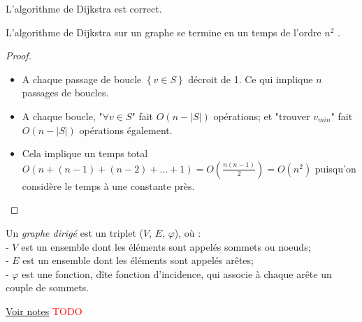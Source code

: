 \begin{mycorr} 
  L’algorithme de Dijkstra est correct.
\end{mycorr}

\begin{mytheo} 
  L’algorithme de Dijkstra sur un graphe se termine en un temps de l’ordre $n^2$ .
  \begin{proof}
    \begin{itemize}
		\item A chaque passage de boucle $\left\lbrace v \in S \right\rbrace $ décroit de 1. Ce qui implique $n$ passages de boucles.
		\item A chaque boucle, "$\forall v \in S$" fait $O(n-|S|)$ opérations; et "trouver $v_{min}$" fait $O(n-|S|)$ opérations également.
		\item Cela implique un temps total $O(n + (n-1) + (n-2) + ... + 1) = O\left( \frac{n(n-1)}{2} \right) = O(n^2)$ puisqu'on considère le temps à une constante près. 
		\end{itemize}
  \end{proof}
\end{mytheo}

\begin{mydef}
  Un \emph{graphe dirigé} est un triplet ($V$, $E$, $\varphi$), où :\\
  - $V$ est un ensemble dont les éléments sont appelés sommets ou noeuds; \\
  - $E$ est un ensemble dont les éléments sont appelés arêtes; \\
  - $\varphi$ est une fonction, dîte fonction d'incidence, qui associe à chaque arête un couple de sommets. \\
\end{mydef}

\begin{myexem}
  \href{https://dl.dropboxusercontent.com/u/44092863/Graph_Theory_Romain_Capron.pdf}{Voir notes} \textcolor{red}{TODO}
\end{myexem}

